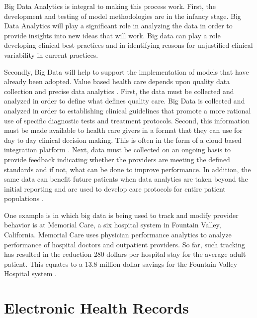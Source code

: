 \documentclass[sigconf]{acmart}
\begin{document}
Big Data Analytics is integral to making this process work. First, the development and testing of model methodologies are in the infancy stage. Big Data Analytics will play a significant role in analyzing the data in order to provide insights into new ideas that will work. Big data can play a role developing clinical best practices and in identifying reasons for unjustified clinical variability in current practices.

Secondly, Big Data will help to support the implementation of models that have already been adopted. Value based health care depends upon quality data collection and precise data analytics \cite{www-google-liason}.  First, the data must be collected and analyzed in order to define what defines quality care. Big Data is collected and analyzed in order to establishing clinical guidelines that promote a more rational use of specific diagnostic tests and treatment protocols.  Second, this information must be made available to health care givers in a format that they can use for day to day clinical decision making. This is often in the form of a cloud based integration platform \cite{www-google-liason}.  Next, data must be collected on an ongoing basis to provide feedback indicating whether the providers are meeting the defined standards and if not, what can be done to improve performance. In addition, the same data can benefit future patients when data analytics are taken beyond the initial reporting and are used to develop care protocols for entire patient populations \cite{www-google-liason}. 

One example is in which big data is being used to track and modify provider behavior is at Memorial Care, a six hospital system in Fountain Valley, California. Memorial Care uses physician performance analytics to analyze performance of hospital doctors and outpatient providers.  So far, such tracking has resulted in the reduction 280 dollars per hospital stay for the average adult patient. This equates to a 13.8 million dollar savings for the Fountain Valley Hospital system \cite{www-google-Datafloq}.
 
\section{Electronic Health Records}
\end{document}

